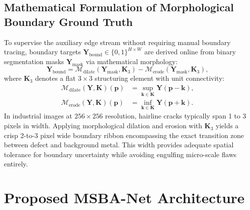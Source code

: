 \documentclass{ieeeaccess}
\begin{document}
\subsection{Mathematical Formulation of Morphological Boundary Ground Truth}
To supervise the auxiliary edge stream without requiring manual boundary tracing, boundary targets $\mathbf{Y}_{\text{bound}} \in \{0, 1\}^{H \times W}$ are derived online from binary segmentation masks $\mathbf{Y}_{\text{mask}}$ via mathematical morphology:
\begin{equation}
  \mathbf{Y}_{\text{bound}} = \mathcal{M}_{\text{dilate}}(\mathbf{Y}_{\text{mask}}, \mathbf{K}_3) - \mathcal{M}_{\text{erode}}(\mathbf{Y}_{\text{mask}}, \mathbf{K}_3),
  \label{eq:morph_boundary}
\end{equation}
where $\mathbf{K}_3$ denotes a flat $3 \times 3$ structuring element with unit connectivity:
\begin{align}
  \mathcal{M}_{\text{dilate}}(\mathbf{Y}, \mathbf{K})(\mathbf{p}) &= \sup_{\mathbf{k} \in \mathbf{K}} \mathbf{Y}(\mathbf{p} - \mathbf{k}), \\
  \mathcal{M}_{\text{erode}}(\mathbf{Y}, \mathbf{K})(\mathbf{p}) &= \inf_{\mathbf{k} \in \mathbf{K}} \mathbf{Y}(\mathbf{p} + \mathbf{k}).
\end{align}
In industrial images at $256 \times 256$ resolution, hairline cracks typically span 1 to 3 pixels in width. Applying morphological dilation and erosion with $\mathbf{K}_3$ yields a crisp 2-to-3 pixel wide boundary ribbon encompassing the exact transition zone between defect and background metal. This width provides adequate spatial tolerance for boundary uncertainty while avoiding engulfing micro-scale flaws entirely.

\section{Proposed MSBA-Net Architecture}
\label{sec:math_foundations}
\end{document}

